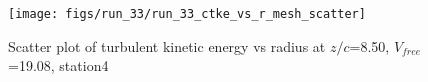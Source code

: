 \begin{figure}[H]
\centering
\texttt{[image: figs/run\_33/run\_33\_ctke\_vs\_r\_mesh\_scatter]}
\caption{Scatter plot of turbulent kinetic energy vs radius at $z/c$=8.50, $V_{free}$=19.08, station4}
\label{fig:run_33_ctke_vs_r_mesh_scatter}
\end{figure}


